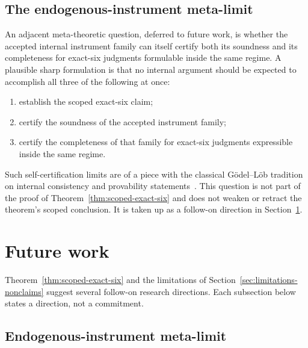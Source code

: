 \documentclass[11pt]{article}
\theoremstyle{definition}
\begin{document}
\subsection{The endogenous-instrument meta-limit}\label{subsec:meta-limit}

An adjacent meta-theoretic question, deferred to future work, is
whether the accepted internal instrument family can itself certify
both its soundness and its completeness for exact-six judgments
formulable inside the same regime. A plausible sharp formulation is
that no internal argument should be expected to accomplish all three
of the following at once:
\begin{enumerate}[topsep=2pt,itemsep=1pt]
  \item establish the scoped exact-six claim;
  \item certify the soundness of the accepted instrument family;
  \item certify the completeness of that family for exact-six
    judgments expressible inside the same regime.
\end{enumerate}
Such self-certification limits are of a piece with the classical
G{\"o}del--L{\"o}b tradition on internal consistency and provability
statements~\citep{Godel1931,Lob1955}. This question is not part of
the proof of Theorem~\ref{thm:scoped-exact-six} and does not weaken
or retract the theorem's scoped conclusion. It is taken up as a
follow-on direction in Section~\ref{sec:future-work}.
 \section{Future work}\label{sec:future-work}



Theorem~\ref{thm:scoped-exact-six} and the limitations of
Section~\ref{sec:limitations-nonclaims} suggest several follow-on
research directions. Each subsection below states a direction, not a
commitment.

\subsection{Endogenous-instrument meta-limit}\label{subsec:future-meta-limit}
\end{document}
